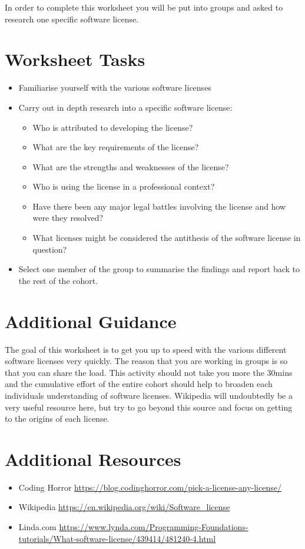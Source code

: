\documentclass{../../../fal_assignment}
\begin{document}
In order to complete this worksheet you will be put into groups and asked to research one specific software license. 

\section*{Worksheet Tasks}
\begin{itemize}
	\item Familiarise yourself with the various software licenses
	\item Carry out in depth research into a specific software license:
		\begin{itemize}
			\item Who is attributed to developing the license?
			\item What are the key requirements of the license?
			\item What are the strengths and weaknesses of the license?
			\item Who is using the license in a professional context?
			\item Have there been any major legal battles involving the license and how were they resolved?
			\item What licenses might be considered the antithesis of the software license in question?
		\end{itemize}
		\item Select one member of the group to summarise the findings and report back to the rest of the cohort. 
\end{itemize}


\section*{Additional Guidance}

The goal of this worksheet is to get you up to speed with the various different software licenses very quickly. The reason that you are working in groups is so that you can share the load. This activity should not take you more the 30mins and the cumulative effort of the entire cohort should help to broaden each individuals understanding of software licenses. Wikipedia will undoubtedly be a very useful resource here, but try to go beyond this source and focus on getting to the origins of each license. 

\section*{Additional Resources}

\begin{itemize}
    \item Coding Horror \url{https://blog.codinghorror.com/pick-a-license-any-license/}
    \item Wikipedia \url{https://en.wikipedia.org/wiki/Software_license}
    \item Linda.com \url{https://www.lynda.com/Programming-Foundations-tutorials/What-software-license/439414/481240-4.html}
\end{itemize}
\end{document}
